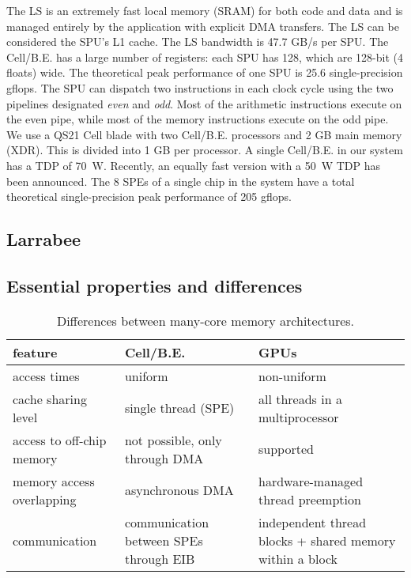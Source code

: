 \documentclass{article}
\begin{document}
The LS is an extremely fast local
memory (SRAM) for both code and data and is managed entirely by the
application with explicit DMA transfers.  The LS can be considered 
the SPU's L1 cache.  %
The LS bandwidth is 47.7 GB/s per SPU.
The \mbox{Cell/B.E.} has a large number of registers: each SPU has 128, which are
128-bit (4 floats) wide. The theoretical peak performance of one SPU
is 25.6 single-precision gflops.
The SPU can dispatch two instructions in each clock cycle using 
the two pipelines designated \emph{even} and
\emph{odd}. Most of the arithmetic instructions execute on the even
pipe, while most of the memory instructions execute on the odd pipe.
We use a QS21 Cell blade with two \mbox{Cell/B.E.} processors and 2 GB
main memory (XDR). This is divided into 1 GB per processor.  
A single \mbox{Cell/B.E.} in our system has a TDP of 70~W. 
Recently, an equally fast version with a 50~W TDP has been announced.
The 8 SPEs of a single chip in the system have a total theoretical single-precision peak performance of 205 gflops.

\subsection{Larrabee}

\subsection{Essential properties and differences}

\begin{table*}
\begin{center}
{\small
\begin{tabular}{l|l|l}
feature                   & Cell/B.E.                  & GPUs \\
\hline
access times              & uniform                    & non-uniform \\
cache sharing level       & single thread (SPE)        & all threads in a multiprocessor \\
access to off-chip memory & not possible, only through DMA               & supported \\
memory access overlapping & asynchronous DMA           & hardware-managed thread preemption \\
communication             & communication between SPEs through EIB      & independent thread blocks + shared memory within a block \\
\end{tabular}
} %
\end{center}
\vspace{-0.5cm}
\caption{Differences between many-core memory architectures.}
\label{memory-properties}
\end{table*}
\end{document}
